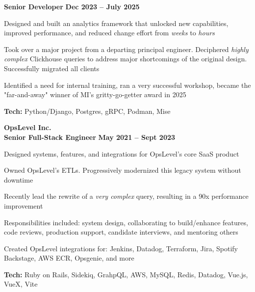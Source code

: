 \documentclass[margin,line]{resume}
\begin{document}
\begin{resume}
    \hspace{2.6mm}\textbf{Senior Developer} \hfill \textbf{Dec 2023 -- July 2025}\vspace{1mm}
    \begin{list2}
        \item Designed and built an analytics framework that unlocked new capabilities, improved performance, and reduced change effort from \textit{weeks} to \textit{hours}
        \vspace{1mm}
        \item Took over a major project from a departing principal engineer. Deciphered \textit{highly complex} Clickhouse queries to address major shortcomings of the original design. Successfully migrated all clients
        \vspace{1mm}
        \item Identified a need for internal training, ran a very successful workshop, became the "far-and-away" winner of MI's gritty-go-getter award in 2025
        \vspace{1mm}
        \item\textbf{Tech:} Python/Django, Postgres, gRPC, Podman, Mise
    \end{list2}



    \hspace{-3mm}\textbf{\listing OpsLevel Inc.} \vspace{3mm}\\\vspace{1mm}
    \hspace{1.2mm}\textbf{Senior Full-Stack Engineer} \hfill \textbf{May 2021 -- Sept 2023}\vspace{1mm}
    \begin{list2}
        \item Designed systems, features, and integrations for OpsLevel's core SaaS product
        \vspace{1mm}
        \item Owned OpsLevel's ETLs. Progressively modernized this legacy system without downtime
        \vspace{1mm}
        \item Recently lead the rewrite of a \textit{very complex} query, resulting in a 90x performance improvement
        \vspace{1mm}
        \item Responsibilities included: system design, collaborating to build/enhance features, code reviews, production support, candidate interviews, and mentoring others
        \vspace{1mm}
        \item Created OpsLevel integrations for: Jenkins, Datadog, Terraform, Jira, Spotify Backstage, AWS ECR, Opsgenie, and more
        \vspace{1mm}
        \item\textbf{Tech:} Ruby on Rails, Sidekiq, GrahpQL, AWS, MySQL, Redis, Datadog, Vue.js, VueX, Vite
    \end{list2}


\end{resume}
\end{document}

